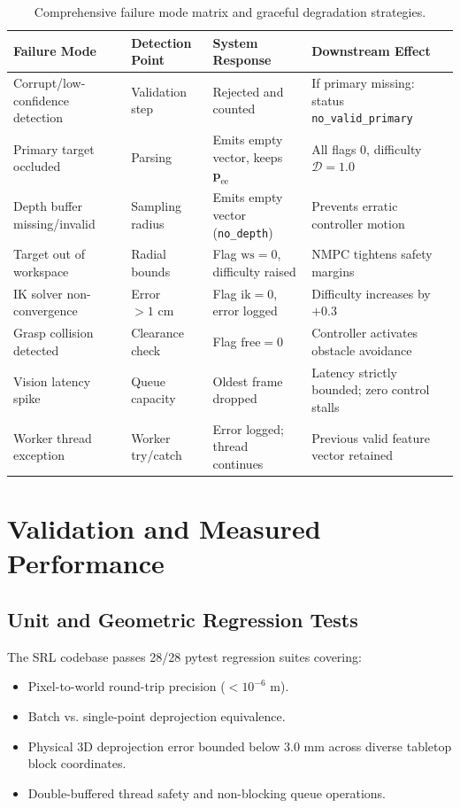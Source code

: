 \documentclass[10pt,a4paper]{article}
\begin{document}
\begin{table}[h]
\centering
\small
\begin{tabularx}{\linewidth}{p{3.6cm}p{3.2cm}p{4.2cm}X}
\toprule
\textbf{Failure Mode} & \textbf{Detection Point} & \textbf{System Response} & \textbf{Downstream Effect} \\
\midrule
Corrupt/low-confidence detection & Validation step & Rejected and counted & If primary missing: status \texttt{no\_valid\_primary} \\
Primary target occluded & Parsing & Emits empty vector, keeps $\mathbf{p}_{\mathrm{ee}}$ & All flags 0, difficulty $\mathcal{D}=1.0$ \\
Depth buffer missing/invalid & Sampling radius & Emits empty vector (\texttt{no\_depth}) & Prevents erratic controller motion \\
Target out of workspace & Radial bounds & Flag $\mathrm{ws}=0$, difficulty raised & NMPC tightens safety margins \\
IK solver non-convergence & Error $> 1\text{ cm}$ & Flag $\mathrm{ik}=0$, error logged & Difficulty increases by $+0.3$ \\
Grasp collision detected & Clearance check & Flag $\mathrm{free}=0$ & Controller activates obstacle avoidance \\
Vision latency spike & Queue capacity & Oldest frame dropped & Latency strictly bounded; zero control stalls \\
Worker thread exception & Worker try/catch & Error logged; thread continues & Previous valid feature vector retained \\
\bottomrule
\end{tabularx}
\caption{Comprehensive failure mode matrix and graceful degradation strategies.}
\label{tab:failure}
\end{table}

\section{Validation and Measured Performance}

\subsection{Unit and Geometric Regression Tests}
The SRL codebase passes 28/28 pytest regression suites covering:
\begin{itemize}
    \item Pixel-to-world round-trip precision ($< 10^{-6}\text{ m}$).
    \item Batch vs. single-point deprojection equivalence.
    \item Physical 3D deprojection error bounded below $3.0\text{ mm}$ across diverse tabletop block coordinates.
    \item Double-buffered thread safety and non-blocking queue operations.
\end{itemize}
\end{document}

